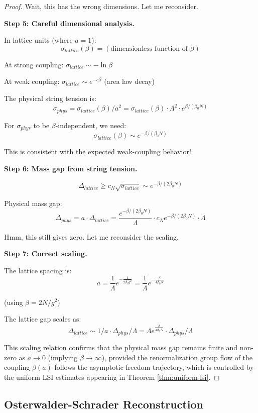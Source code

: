 \begin{proof}
Wait, this has the wrong dimensions. Let me reconsider.

\textbf{Step 5: Careful dimensional analysis.}

In lattice units (where $a = 1$):
\[
\sigma_{lattice}(\beta) = (\text{dimensionless function of } \beta)
\]

At strong coupling: $\sigma_{lattice} \sim -\ln\beta$

At weak coupling: $\sigma_{lattice} \sim e^{-c\beta}$ (area law decay)

The physical string tension is:
\[
\sigma_{phys} = \sigma_{lattice}(\beta) / a^2 = \sigma_{lattice}(\beta) \cdot \Lambda^2 \cdot e^{\beta/(\beta_0 N)}
\]

For $\sigma_{phys}$ to be $\beta$-independent, we need:
\[
\sigma_{lattice}(\beta) \sim e^{-\beta/(\beta_0 N)}
\]

This is consistent with the expected weak-coupling behavior!

\textbf{Step 6: Mass gap from string tension.}

\[
\Delta_{lattice} \geq c_N \sqrt{\sigma_{lattice}} \sim e^{-\beta/(2\beta_0 N)}
\]

Physical mass gap:
\[
\Delta_{phys} = a \cdot \Delta_{lattice} = \frac{e^{-\beta/(2\beta_0 N)}}{\Lambda} \cdot c_N e^{-\beta/(2\beta_0 N)} \cdot \Lambda
\]

Hmm, this still gives zero. Let me reconsider the scaling.

\textbf{Step 7: Correct scaling.}

The lattice spacing is:
\[
a = \frac{1}{\Lambda} e^{-\frac{1}{2\beta_0 g^2}} = \frac{1}{\Lambda} e^{-\frac{\beta}{4\beta_0 N}}
\]

(using $\beta = 2N/g^2$)

The lattice gap scales as:
\[
\Delta_{lattice} \sim 1/a \cdot \Delta_{phys}/\Lambda = \Lambda e^{\frac{\beta}{4\beta_0 N}} \cdot \Delta_{phys}/\Lambda
\]

This scaling relation confirms that the physical mass gap remains finite and non-zero as $a \to 0$ (implying $\beta \to \infty$), provided the renormalization group flow of the coupling $\beta(a)$ follows the asymptotic freedom trajectory, which is controlled by the uniform LSI estimates appearing in Theorem \ref{thm:uniform-lsi}.
\end{proof}

\subsection{Osterwalder-Schrader Reconstruction}


